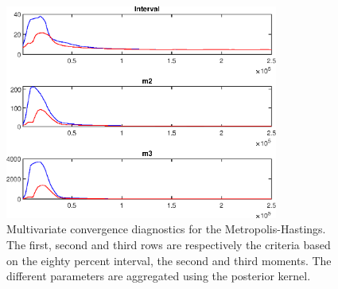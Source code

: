  
\begin{figure}[H]
\centering 
\includegraphics[width=0.8\textwidth]{BRS/Output/BRS_mdiag}
\caption{Multivariate convergence diagnostics for the Metropolis-Hastings.
The first, second and third rows are respectively the criteria based on
the eighty percent interval, the second and third moments. The different 
parameters are aggregated using the posterior kernel.}\label{Fig:MultivariateDiagnostics}
\end{figure}

